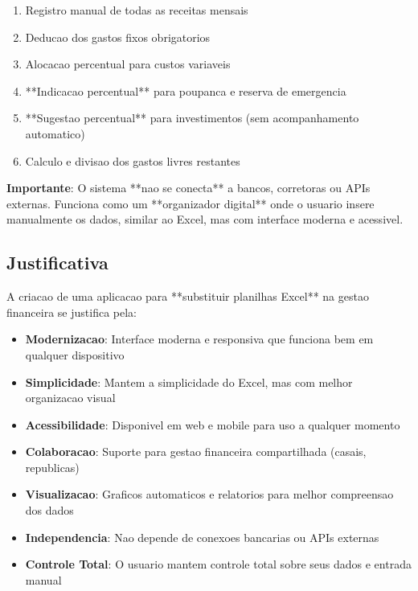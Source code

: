 \begin{enumerate}
    \item Registro manual de todas as receitas mensais
    \item Deducao dos gastos fixos obrigatorios
    \item Alocacao percentual para custos variaveis
    \item **Indicacao percentual** para poupanca e reserva de emergencia
    \item **Sugestao percentual** para investimentos (sem acompanhamento automatico)
    \item Calculo e divisao dos gastos livres restantes
\end{enumerate}

\textbf{Importante}: O sistema **nao se conecta** a bancos, corretoras ou APIs externas. Funciona como um **organizador digital** onde o usuario insere manualmente os dados, similar ao Excel, mas com interface moderna e acessivel.

\subsection{Justificativa}

A criacao de uma aplicacao para **substituir planilhas Excel** na gestao financeira se justifica pela:

\begin{itemize}
    \item \textbf{Modernizacao}: Interface moderna e responsiva que funciona bem em qualquer dispositivo
    \item \textbf{Simplicidade}: Mantem a simplicidade do Excel, mas com melhor organizacao visual
    \item \textbf{Acessibilidade}: Disponivel em web e mobile para uso a qualquer momento
    \item \textbf{Colaboracao}: Suporte para gestao financeira compartilhada (casais, republicas)
    \item \textbf{Visualizacao}: Graficos automaticos e relatorios para melhor compreensao dos dados
    \item \textbf{Independencia}: Nao depende de conexoes bancarias ou APIs externas
    \item \textbf{Controle Total}: O usuario mantem controle total sobre seus dados e entrada manual
\end{itemize}
